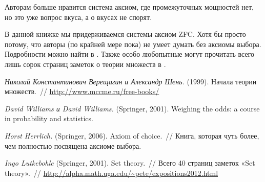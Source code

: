 \documentclass[12pt, a4paper]{article}
\begin{document}
\begin{center}
\end{center}

Авторам больше нравится система аксиом, где промежуточных мощностей нет, но это уже вопрос вкуса, а о вкусах не спорят.

В данной книжке мы придерживаемся системы аксиом ZFC. Хотя бы просто потому, что авторы (по крайней мере пока) не умеет думать без аксиомы выбора. Подробности можно найти в \cite{herrlich:axiom}. Также особо любопытные могут прочитать всего лишь сорок страниц заметок о теории множеств в \cite{Franclin:sets}.

\begin{thebibliography}{1}
	\emph{Николай Константинович Верещагин и Александр Шень.} (1999).
	Начала теории множеств.~//
	\url{http://www.mccme.ru/free-books/}
	
	\emph{David Williams и David Williams.} (Springer, 2001).
	Weighing the odds: a course in probability and statistics.

	\emph{Horst Herrlich.} (Springer, 2006).
	Axiom of choice.~//
	Книга, которая чуть более, чем полностью посвящена аксиоме выбора.
	 
	\emph{Ingo Lutkebohle} (Springer, 2001).
	Set theory.~//
	Всего 40 страниц заметок «Set theory».~// \url{http://alpha.math.uga.edu/~pete/expositions2012.html}
\end{thebibliography}
\end{document}
